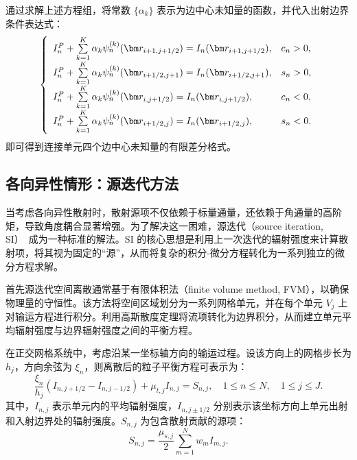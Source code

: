 通过求解上述方程组，将常数 $\{\alpha_{k}\}$ 表示为边中心未知量的函数，并代入出射边界条件表达式：
\begin{equation}
    \left\{\begin{array}{lll}
        I^{P}_{n}+\sum\limits_{k=1}^{K}\alpha_{k}\psi^{(k)}_{n}(\br_{i+1,j+1/2})=I_{n}(\br_{i+1,j+1/2}), & c_{n}>0, \\
        I^{P}_{n}+\sum\limits_{k=1}^{K}\alpha_{k}\psi^{(k)}_{n}(\br_{i+1/2,j+1})=I_{n}(\br_{i+1/2,j+1}), & s_{n}>0, \\
        I^{P}_{n}+\sum\limits_{k=1}^{K}\alpha_{k}\psi^{(k)}_{n}(\br_{i,j+1/2})=I_{n}(\br_{i,j+1/2}),     & c_{n}<0, \\
        I^{P}_{n}+\sum\limits_{k=1}^{K}\alpha_{k}\psi^{(k)}_{n}(\br_{i+1/2,j})=I_{n}(\br_{i+1/2,j}),     & s_{n}<0.
    \end{array}\right.
\end{equation}
即可得到连接单元四个边中心未知量的有限差分格式。

\subsection{各向异性情形：源迭代方法}
\label{sec:source-iteration}

当考虑各向异性散射时，散射源项不仅依赖于标量通量，还依赖于角通量的高阶矩，导致角度耦合显著增强。为了解决这一困难，源迭代（source iteration, SI）~\cite{adams2002fast}成为一种标准的解法。SI 的核心思想是利用上一次迭代的辐射强度来计算散射项，将其视为固定的“源”，从而将复杂的积分-微分方程转化为一系列独立的微分方程求解。

首先源迭代空间离散通常基于有限体积法（finite volume method, FVM），以确保物理量的守恒性。该方法将空间区域划分为一系列网格单元，并在每个单元 $V_j$ 上对输运方程进行积分。利用高斯散度定理将流项转化为边界积分，从而建立单元平均辐射强度与边界辐射强度之间的平衡方程。

在正交网格系统中，考虑沿某一坐标轴方向的输运过程。设该方向上的网格步长为 $h_j$，方向余弦为 $\xi_n$，则离散后的粒子平衡方程可表示为：
\begin{equation}\label{eq:balance}
    \frac{\xi_n}{h_j} (I_{n, j+1/2} - I_{n, j-1/2}) + \mu_{t,j} I_{n,j} = S_{n,j}, \quad 1 \le n \le N, \quad 1 \le j \le J.
\end{equation}
其中，$I_{n,j}$ 表示单元内的平均辐射强度，$I_{n, j \pm 1/2}$ 分别表示该坐标方向上单元出射和入射边界处的辐射强度。$S_{n,j}$ 为包含散射贡献的源项：
\begin{equation}
    S_{n,j} = \frac{\mu_{s,j}}{2} \sum_{m=1}^N w_m I_{m,j}.
\end{equation}

